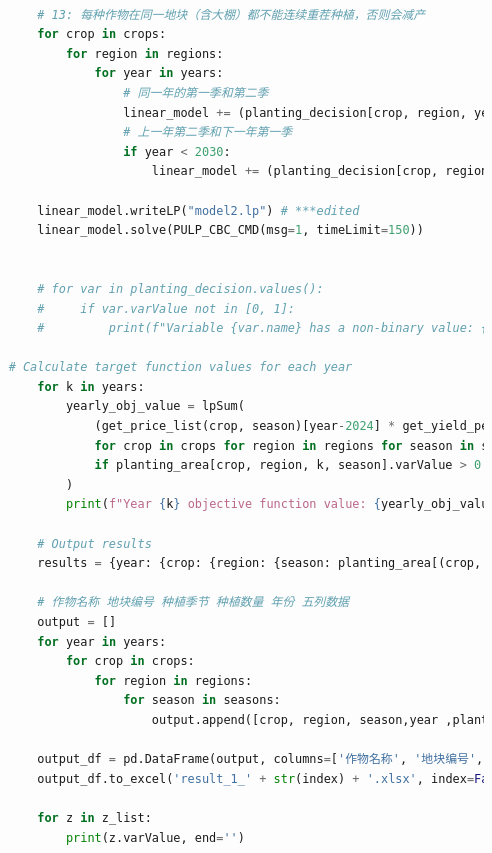 \documentclass[withoutpreface]{cumcmthesis}
\begin{document}
\begin{appendices}
\begin{lstlisting}[language=python]
        
        # 13: 每种作物在同一地块（含大棚）都不能连续重茬种植，否则会减产
        for crop in crops:
            for region in regions:
                for year in years:
                    # 同一年的第一季和第二季
                    linear_model += (planting_decision[crop, region, year, '第一季'] + planting_decision[crop, region, year, '第二季'] <= 1)
                    # 上一年第二季和下一年第一季
                    if year < 2030:
                        linear_model += (planting_decision[crop, region, year, '第二季'] + planting_decision[crop, region, year+1, '第一季'] <= 1)
    
        linear_model.writeLP("model2.lp") # ***edited
        linear_model.solve(PULP_CBC_CMD(msg=1, timeLimit=150))
    
    
        # for var in planting_decision.values():
        #     if var.varValue not in [0, 1]:
        #         print(f"Variable {var.name} has a non-binary value: {var.varValue}")
    
    # Calculate target function values for each year
        for k in years:
            yearly_obj_value = lpSum(
                (get_price_list(crop, season)[year-2024] * get_yield_per_acre_list(crop, region)[year-2024] - get_cost_list(crop, region)[year-2024]) * planting_area[crop, region, k, season].varValue
                for crop in crops for region in regions for season in seasons
                if planting_area[crop, region, k, season].varValue > 0  # Only consider variables with planting area greater than 0
            )
            print(f"Year {k} objective function value: {yearly_obj_value}")
    
        # Output results
        results = {year: {crop: {region: {season: planting_area[(crop, region, year, season)].varValue for season in seasons} for region in regions} for crop in crops} for year in years}
    
        # 作物名称 地块编号 种植季节 种植数量 年份 五列数据
        output = []
        for year in years:
            for crop in crops:
                for region in regions:
                    for season in seasons:
                        output.append([crop, region, season,year ,planting_area[(crop, region, year, season)].varValue])
    
        output_df = pd.DataFrame(output, columns=['作物名称', '地块编号', '种植季节','年份', '种植数量'])
        output_df.to_excel('result_1_' + str(index) + '.xlsx', index=False)
    
        for z in z_list:
            print(z.varValue, end='')
    

\end{lstlisting}
\end{appendices}
\end{document}
